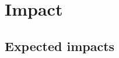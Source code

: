 \documentclass[11pt, a4paper]{article} %
\begin{document}

\section{Impact}

\subsection{Expected impacts}
\end{document}
